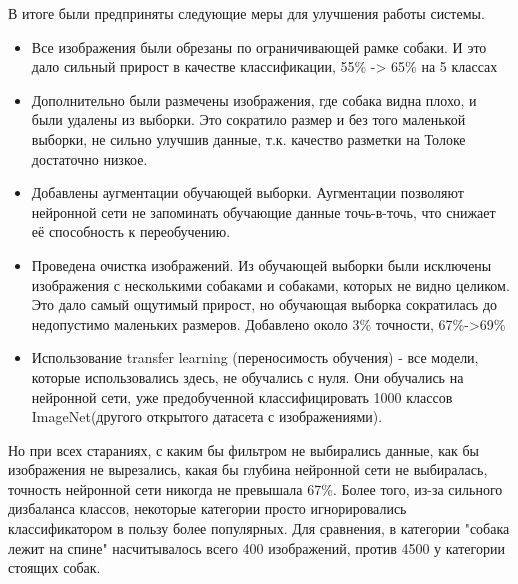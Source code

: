 В итоге были предприняты следующие меры для улучшения работы системы.
\begin{itemize}
    \item Все изображения были обрезаны по ограничивающей рамке собаки. И это дало сильный прирост в качестве классификации, 55\% -> 65\% на 5 классах
    \item Дополнительно были размечены изображения, где собака видна плохо, и были удалены из выборки. Это сократило размер и без того маленькой выборки, не сильно улучшив данные, т.к. качество разметки на Толоке достаточно низкое.
    \item Добавлены аугментации обучающей выборки. Аугментации позволяют нейронной сети не запоминать обучающие данные точь-в-точь, что снижает её способность к переобучению.
    \item Проведена очистка изображений. Из обучающей выборки были исключены изображения с несколькими собаками и собаками, которых не видно целиком. Это дало самый ощутимый прирост, но обучающая выборка сократилась до недопустимо маленьких размеров. Добавлено около 3\% точности, 67\%->69\%
    \item Использование transfer learning (переносимость обучения) - все модели, которые использовались здесь, не обучались с нуля. Они обучались на нейронной сети, уже предобученной классифицировать 1000 классов ImageNet(другого открытого датасета с изображениями).
\end{itemize}

Но при всех стараниях, с каким бы фильтром не выбирались данные, как бы изображения не вырезались, какая бы глубина нейронной сети не выбиралась, точность нейронной сети никогда не превышала 67\%. Более того, из-за сильного дизбаланса классов, некоторые категории просто игнорировались классификатором в пользу более популярных. Для сравнения, в категории "собака лежит на спине" насчитывалось всего 400 изображений, против 4500 у категории стоящих собак. 

